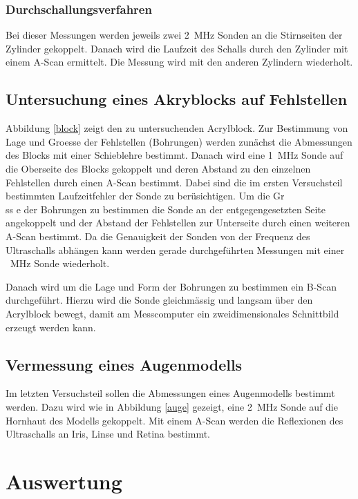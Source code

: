 \documentclass[11pt,ngerman,a4paper]{article}
\begin{document}
\subsubsection{Durchschallungsverfahren}
Bei dieser Messungen werden jeweils zwei \SI{2}{\mega\hertz} Sonden an die Stirnseiten der Zylinder gekoppelt. Danach wird die Laufzeit des Schalls durch den Zylinder mit einem A-Scan ermittelt. Die Messung wird mit den anderen Zylindern wiederholt.
\subsection{Untersuchung eines Akryblocks auf Fehlstellen}
Abbildung \ref{block} zeigt den zu untersuchenden Acrylblock. Zur Bestimmung von Lage und Groesse der Fehlstellen (Bohrungen) werden zun\"achst die Abmessungen des Blocks mit einer Schieblehre bestimmt. Danach wird eine \SI{1}{\mega\hertz} Sonde auf die Oberseite des Blocks gekoppelt und deren Abstand zu den einzelnen Fehlstellen durch einen A-Scan bestimmt. Dabei sind die im ersten Versuchsteil bestimmten Laufzeitfehler der Sonde zu ber\"usichtigen. Um die Gr\"\\ss e der Bohrungen zu bestimmen die Sonde an der entgegengesetzten Seite angekoppelt und der Abstand der Fehlstellen zur Unterseite durch einen weiteren A-Scan bestimmt. Da die Genauigkeit der Sonden von der Frequenz des Ultraschalls abh\"angen kann werden gerade durchgef\"uhrten Messungen mit einer \SI{}{\mega\hertz} Sonde wiederholt. 

\noindent
Danach wird um die Lage und Form der Bohrungen zu bestimmen ein B-Scan durchgef\"uhrt. Hierzu wird die Sonde gleichm\"assig und langsam \"uber den Acrylblock bewegt, damit am Messcomputer ein zweidimensionales Schnittbild erzeugt werden kann.

\subsection{Vermessung eines  Augenmodells}
Im letzten Versuchsteil sollen die Abmessungen eines Augenmodells bestimmt werden. Dazu wird wie in Abbildung \ref{auge} gezeigt, eine \SI{2}{\mega\hertz} Sonde auf die Hornhaut des Modells gekoppelt. Mit einem A-Scan werden die Reflexionen des Ultraschalls an Iris, Linse und Retina bestimmt.



\section{Auswertung}
\end{document}
